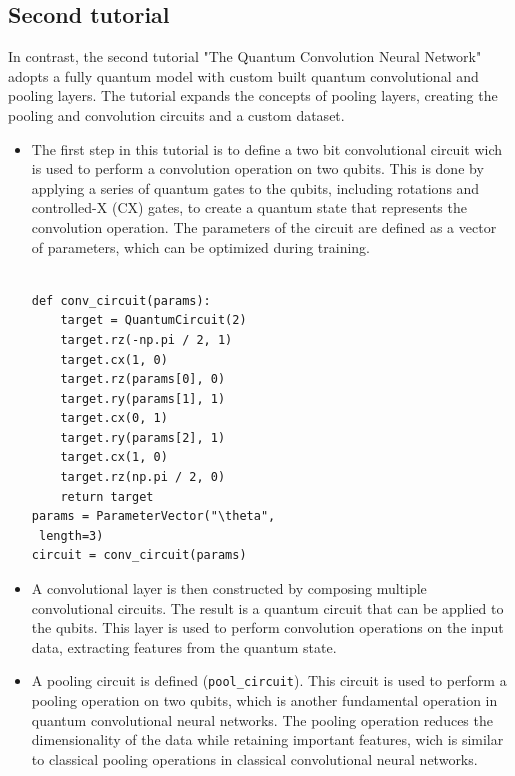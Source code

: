 \documentclass[conference]{IEEEtran}
\begin{document}
\subsection*{\fontsize{12}{16}\selectfont Second tutorial}
\noindent
In contrast, the second tutorial "The Quantum Convolution Neural Network" \cite{qiskit_qcnn_tutorial} adopts a fully quantum model with custom built quantum convolutional and pooling layers.
The tutorial expands the concepts of pooling layers, creating the pooling and convolution circuits and a custom dataset.\\



\begin{itemize}
\item The first step in this tutorial is to define a two bit convolutional circuit wich is used to perform a convolution operation on two qubits. This is done by applying a series of quantum gates to the qubits, including rotations and controlled-X (CX) gates, to create a quantum state that represents the convolution operation. The parameters of the circuit are defined as a vector of parameters, which can be optimized during training.
{\small
\begin{verbatim}

def conv_circuit(params):
    target = QuantumCircuit(2)
    target.rz(-np.pi / 2, 1)
    target.cx(1, 0)
    target.rz(params[0], 0)
    target.ry(params[1], 1)
    target.cx(0, 1)
    target.ry(params[2], 1)
    target.cx(1, 0)
    target.rz(np.pi / 2, 0)
    return target
params = ParameterVector("\theta",
 length=3)
circuit = conv_circuit(params)

\end{verbatim}}
    

    \item A convolutional layer is then constructed by composing multiple convolutional circuits. The result is a quantum circuit that can be applied to the qubits. This layer is used to perform convolution operations on the input data, extracting features from the quantum state.\\
    

    \item A pooling circuit is defined (\texttt{pool\_circuit}). This circuit is used to perform a pooling operation on two qubits, which is another fundamental operation in quantum convolutional neural networks. The pooling operation reduces the dimensionality of the data while retaining important features, wich is similar to classical pooling operations in classical convolutional neural networks. 



\end{itemize}
\end{document}
